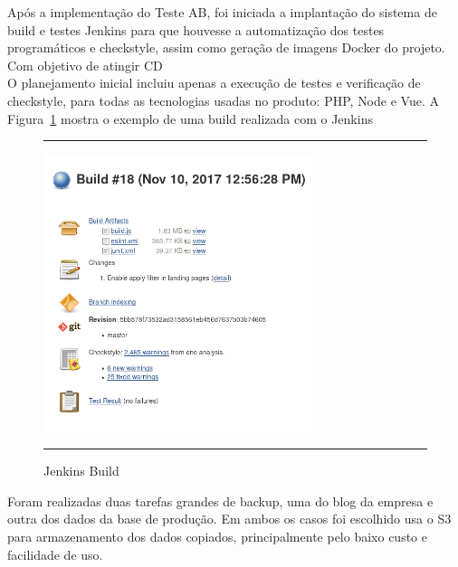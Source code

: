 Após a implementação do \gls{Teste AB}, foi iniciada a implantação do sistema de build e testes \gls{Jenkins} para que houvesse a automatização dos testes programáticos e \gls{checkstyle}, assim como geração de imagens \gls{Docker} do projeto. Com objetivo de atingir \gls{CD}\\

O planejamento inicial incluiu apenas a execução de testes e verificação de \gls{checkstyle}, para todas as tecnologias usadas no produto: \gls{PHP}, \gls{Node} e \gls{Vue}. A Figura~\ref{fig:jenkinsBuild} mostra o exemplo de uma build realizada com o \gls{Jenkins}\\

\begin{figure}[h]
  \rule[1ex]{\textwidth}{0.25pt}
  \centering\includegraphics[width=0.70\textwidth]{img/JenkinsBuild.png}
  \caption[Jenkins Build]
  {Jenkins Build}\label{fig:jenkinsBuild}
  \rule[1ex]{\textwidth}{0.25pt}
\end{figure}

Foram realizadas duas tarefas grandes de \gls{backup}, uma do blog da empresa e outra dos dados da base de produção. Em ambos os casos foi escolhido usa o \gls{S3} para armazenamento dos dados copiados, principalmente pelo baixo custo e facilidade de uso.\\


%
%

